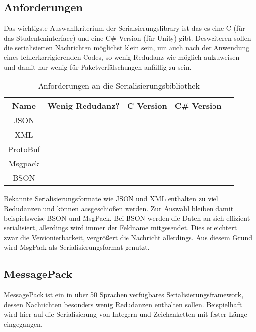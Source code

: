 \subsection{Anforderungen}
Das wichtigste Auswahlkriterium der Serialsierungslibrary ist das es eine C (f{\"{u}}r das Studenteninterface) und eine C\# Version (f{\"{u}}r Unity) gibt.
Desweiteren sollen die serialisierten Nachrichten m{\"{o}}glichst klein sein, um auch nach der Anwendung
eines fehlerkorrigierenden Codes, so wenig Redudanz wie m{\"{o}}glich aufzuweisen und damit nur wenig f{\"{u}}r Paketverf{\"{a}}lschungen anf{\"{a}}llig zu sein.

\begin{table}[h]
\centering
\begin{tabu}{c | c | c | c | p{5cm}}
	\toprule
	Name & Wenig Redudanz? & C Version & C\# Version \\
	\midrule
	JSON & \xmark & \checkmark & \checkmark \\
	XML & \xmark & \checkmark & \checkmark \\
	ProtoBuf & \checkmark & \xmark\footnotemark & \checkmark \\
	Msgpack\cite{msgpack} & \checkmark & \checkmark & \checkmark \\
	BSON & \checkmark & \checkmark & \checkmark \\
	\bottomrule
\end{tabu}
\caption{Anforderungen an die Serialisierungsbibliothek}
\end{table}

Bekannte Serialisierungsformate wie JSON und XML enthalten zu viel Redudanzen und k{\"{o}}nnen ausgeschio{\ss}en werden. Zur Auswahl bleiben damit beispielsweise BSON und MsgPack.
Bei BSON werden die Daten an sich effizient serialisiert, allerdings wird immer der Feldname mitgesendet. Dies erleichtert zwar die Versionierbarkeit, vergr{\"{o}}{\ss}ert
die Nachricht allerdings. Aus diesem Grund wird MsgPack als Serialisierungsformat genutzt.

\subsection{MessagePack}
MessagePack ist ein in {\"{u}}ber 50 Sprachen verf{\"{u}}gbares Serialisierungsframework, dessen Nachrichten besonders wenig Redudanzen enthalten sollen. Beispielhaft wird hier auf die Serialisierung von
Integern und Zeichenketten mit fester L{\"{a}}nge eingegangen.

